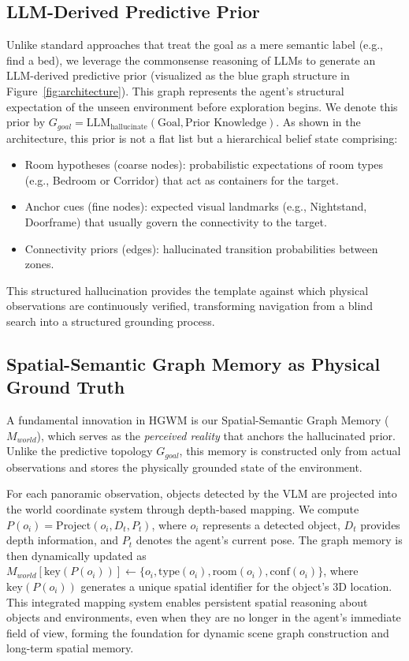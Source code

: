 \documentclass{article}
\begin{document}
\subsection{LLM-Derived Predictive Prior}
\label{sec:goal_hallucination}
Unlike standard approaches that treat the goal as a mere semantic label (e.g., find a bed), we leverage the commonsense reasoning of LLMs to generate an LLM-derived predictive prior (visualized as the blue graph structure in Figure~\ref{fig:architecture}). This graph represents the agent's structural expectation of the unseen environment before exploration begins.
We denote this prior by $G_{goal} = \text{LLM}_{\text{hallucinate}}(\text{Goal}, \text{Prior Knowledge})$. As shown in the architecture, this prior is not a flat list but a hierarchical belief state comprising:
\begin{itemize}
    \item Room hypotheses (coarse nodes): probabilistic expectations of room types (e.g., Bedroom or Corridor) that act as containers for the target.
    \item Anchor cues (fine nodes): expected visual landmarks (e.g., Nightstand, Doorframe) that usually govern the connectivity to the target.
    \item Connectivity priors (edges): hallucinated transition probabilities between zones.
\end{itemize}
This structured hallucination provides the template against which physical observations are continuously verified, transforming navigation from a blind search into a structured grounding process.

\subsection{Spatial-Semantic Graph Memory as Physical Ground Truth}
\label{sec:world_model}

A fundamental innovation in HGWM is our Spatial-Semantic Graph Memory ($M_{world}$), which serves as the \textit{perceived reality} that anchors the hallucinated prior. Unlike the predictive topology $G_{goal}$, this memory is constructed only from actual observations and stores the physically grounded state of the environment.

For each panoramic observation, objects detected by the VLM are projected into the world coordinate system through depth-based mapping. We compute $P(o_i) = \text{Project}(o_i, D_t, P_t)$, where $o_i$ represents a detected object, $D_t$ provides depth information, and $P_t$ denotes the agent's current pose. The graph memory is then dynamically updated as $M_{world}[\text{key}(P(o_i))] \leftarrow \{o_i, \text{type}(o_i), \text{room}(o_i), \text{conf}(o_i)\}$, where $\text{key}(P(o_i))$ generates a unique spatial identifier for the object's 3D location. This integrated mapping system enables persistent spatial reasoning about objects and environments, even when they are no longer in the agent's immediate field of view, forming the foundation for dynamic scene graph construction and long-term spatial memory.
\end{document}

